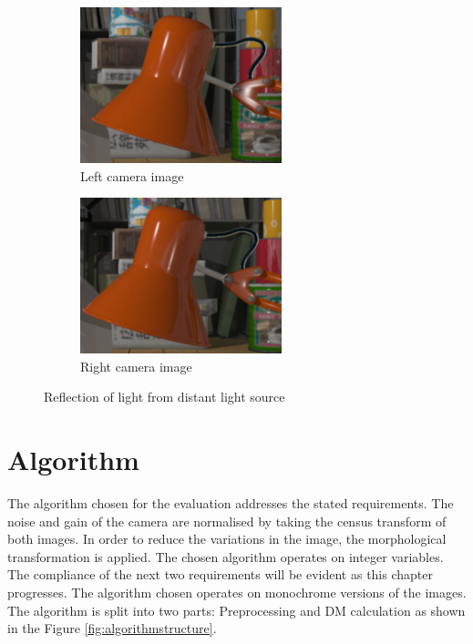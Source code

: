 \begin{figure}
\begin{subfigure}{.5\textwidth}
  \centering
  \includegraphics[width=.6\linewidth]{figures/reflectionleft}
  \caption{Left camera image}
  \label{fig:sfrl}
\end{subfigure}%
\begin{subfigure}{.5\textwidth}
  \centering
  \includegraphics[width=.6\linewidth]{figures/reflectionright}
  \caption{Right camera image}
  \label{fig:sfrr}
\end{subfigure}
\caption{Reflection of light from distant light source}
\label{fig:reflection}
\end{figure}



\section{Algorithm}
\label{s:algorithm}

The algorithm chosen for the evaluation addresses the stated requirements. The noise and gain of the camera are normalised by taking the census transform of both images. In order to reduce the variations in the image, the morphological transformation is applied. The chosen algorithm operates on integer variables. The compliance of the next two requirements will be evident as this chapter progresses. The algorithm chosen operates on monochrome versions of the images. The algorithm is split into two parts: Preprocessing and DM calculation as shown in the Figure \ref{fig:algorithmstructure}.

